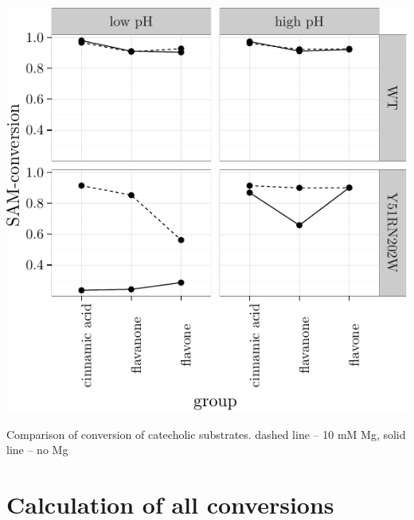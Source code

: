 \documentclass[]{tufte-handout}
\begin{document}
\begin{marginfigure}
 \includegraphics{tufte_files/figure-latex/plot_conversion_catechol-1.pdf}
\caption{Comparison of conversion of catecholic substrates. dashed line -- 10 mM Mg, solid line -- no Mg}
\end{marginfigure}

\section{Calculation of all
conversions}\label{calculation-of-all-conversions}
\end{document}
